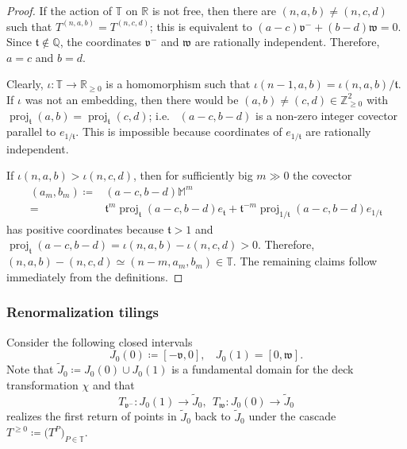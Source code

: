 \documentclass{amsart}
\newcommand{\proj}{\operatorname{proj}}
\renewcommand{\sp}{{\ \ }}
\newcommand{\1}{{\mathbb 1 }}
\newcommand\PT{\mathbb{ T}}
\newcommand\M{\mathbb M}
\newcommand{\vv}{\mathfrak{v}}
\newcommand{\ww}{\mathfrak{w}}
\renewcommand{\tt}{\mathfrak{t}}
\newcommand{\Q}{\mathbb{Q}}
\newcommand{\R}{\mathbb{R}}
\newcommand{\Z}{\mathbb{Z}}
\theoremstyle{remark}
\numberwithin{equation}{section}
\theoremstyle{definition}
\theoremstyle{nonumberbreak}
\begin{document}
\begin{proof}
If the action of $\PT$ on $\R$ is not free, then there are $(n,a,b)\not= (n,c,d)$ such that
$T^{(n,a,b)}=T^{(n,c,d)}$; this is equivalent to $(a-c)\vv^-+(b-d)\ww=0$. Since $\tt\not\in \Q$, the coordinates $\vv^-$ and $\ww$ are rationally independent. Therefore, $a=c$ and $b=d$. 

Clearly, $\iota\colon \PT\to \R_{\ge0}$ is a homomorphism such that $\iota(n-1,a,b)= \iota(n,a,b)/\tt$. If $\iota$ was not an embedding, then there would be $(a,b)\not=(c,d)\in \Z^2_{\ge 0}$ with 
$\proj_\tt (
          a , b)= \proj_\tt  (
          c , d
        )$; i.e.~ $(
          a-c , b-d)$ is a non-zero integer covector parallel to $e_{1/\tt}$. This is impossible because coordinates of $e_{1/\tt}$ are rationally independent.

If $\iota(n,a,b)> \iota(n,c,d)$, then for sufficiently big $m\gg 0$ the covector
  \begin{align*}
 \left(
          a_m , b_m \right) \coloneqq & \left(
          a-c , b-d \right)\M^m \\ =& \tt^m\proj_\tt \left(
          a-c , b-d \right)   e_\tt +  \tt^{-m}\proj_{1/\tt} \left(
          a-c , b-d \right)  e_{1/\tt} 
\end{align*}
   has positive coordinates because $\tt>1$ and $\proj_\tt \left(
          a-c , b-d \right)  =\iota(n,a,b)- \iota(n,c,d)>0$. Therefore, $ (n,a,b)-(n,c,d)\simeq (n-m, a_m, b_m) \in \PT$. The remaining claims follow immediately from the definitions.
\end{proof}  

\subsubsection{Renormalization tilings}
\label{sss:ren tiling:transl}
Consider the following closed intervals
\[J_{0}(0)\coloneqq [-\vv,0],\sp\sp J_{0}(1)=[0,\ww].\]
Note that $\widetilde J_0\coloneqq J_{0}(0)\cup J_{0}(1)$ is a fundamental domain for the deck transformation $\chi$ and that
\[T_{\vv^-}\colon  J_{0}(1) \to \widetilde J_0,\sp T_{\ww}\colon  J_{0}(0) \to \widetilde J_0 \]
 realizes the first return of points in $\widetilde J_0$ back to $\widetilde J_0$ under the cascade $T^{\ge0}\coloneqq \big(T^P\big)_{P\in \PT}$. 
 
\end{document}
